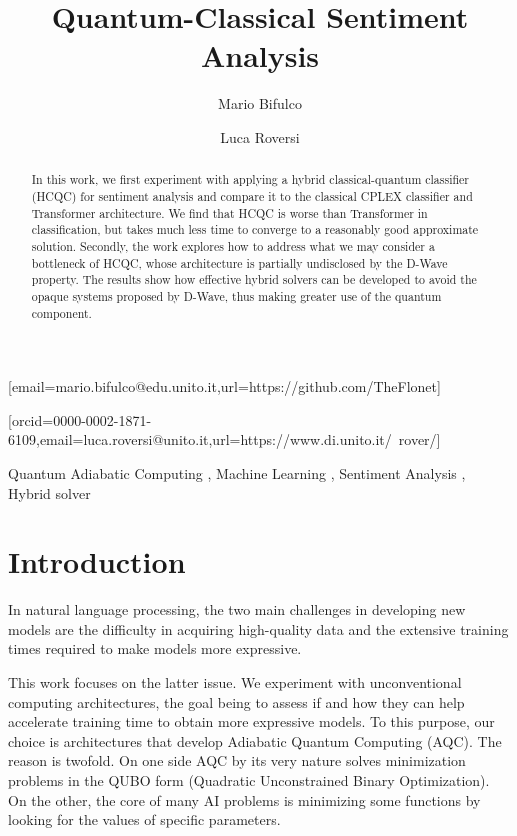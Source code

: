 \documentclass{ceurart}
\begin{document}
\title{Quantum-Classical Sentiment Analysis}
\author[1]{Mario Bifulco}[email=mario.bifulco@edu.unito.it,url=https://github.com/TheFlonet]
\author[1]{Luca Roversi}[orcid=0000-0002-1871-6109,email=luca.roversi@unito.it,url=https://www.di.unito.it/~rover/]
\address[1]{Università degli studi di Torino, Dipartimento di Informatica, Corso Svizzera 185 - 10149 Torino}

\begin{abstract}
    In this work, we first experiment with applying a hybrid classical-quantum classifier (HCQC) for sentiment analysis and compare it to the classical CPLEX classifier and Transformer architecture. We find that HCQC is worse than Transformer in classification, but takes much less time to converge to a reasonably good approximate solution. Secondly, the work explores how to address what we may consider a bottleneck of HCQC, whose architecture is partially undisclosed by the D-Wave property. The results show how effective hybrid solvers can be developed to avoid the opaque systems proposed by D-Wave, thus making greater use of the quantum component.
\end{abstract}
\begin{keywords}
    Quantum Adiabatic Computing \sep 
    Machine Learning \sep
    Sentiment Analysis \sep 
    Hybrid solver 
\end{keywords}

\maketitle

\section{Introduction}
In natural language processing, the two main challenges in developing new models are the difficulty in acquiring high-quality data and the extensive training times required to make models more expressive\cite{scaling}.

This work focuses on the latter issue. We experiment with unconventional computing architectures, the goal being to assess if and how they can help accelerate training time to obtain more expressive models. To this purpose, our choice is architectures that develop Adiabatic Quantum Computing (AQC). The reason is twofold. On one side AQC by its very nature solves minimization problems in the QUBO form (Quadratic Unconstrained Binary Optimization). On the other, the core of many AI problems is minimizing some functions by looking for the values of specific parameters.
\end{document}
